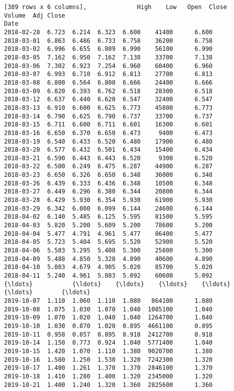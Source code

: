 \documentclass[11pt]{article}
\begin{document}
\begin{Verbatim}[commandchars=\\\{\}]
[389 rows x 6 columns],              High    Low   Open  Close   Volume  Adj Close
Date                                                      
2018-02-28  6.723  6.214  6.323  6.600    41400      6.600
2018-03-01  6.863  6.486  6.733  6.758    36200      6.758
2018-03-02  6.996  6.655  6.809  6.990    56100      6.990
2018-03-05  7.162  6.950  7.162  7.138    33700      7.138
2018-03-06  7.302  6.923  7.254  6.960    60400      6.960
2018-03-07  6.993  6.710  6.912  6.813    27700      6.813
2018-03-08  6.800  6.564  6.800  6.666    24400      6.666
2018-03-09  6.820  6.393  6.762  6.518    28300      6.518
2018-03-12  6.637  6.440  6.620  6.547    32400      6.547
2018-03-13  6.910  6.600  6.625  6.773    45800      6.773
2018-03-14  6.790  6.625  6.790  6.737    33700      6.737
2018-03-15  6.711  6.600  6.711  6.601    16300      6.601
2018-03-16  6.650  6.370  6.650  6.473     9400      6.473
2018-03-19  6.540  6.433  6.520  6.480    17900      6.480
2018-03-20  6.577  6.432  6.501  6.434    15400      6.434
2018-03-21  6.590  6.443  6.443  6.520     9300      6.520
2018-03-22  6.500  6.249  6.475  6.287    44900      6.287
2018-03-23  6.650  6.326  6.650  6.348    36000      6.348
2018-03-26  6.439  6.333  6.436  6.348    10500      6.348
2018-03-27  6.449  6.296  6.380  6.344    20800      6.344
2018-03-28  6.429  5.930  6.354  5.930    61900      5.930
2018-03-29  6.342  6.000  6.099  6.144    24600      6.144
2018-04-02  6.140  5.485  6.125  5.595    81500      5.595
2018-04-03  5.820  5.200  5.609  5.200    78600      5.200
2018-04-04  5.477  4.791  4.961  5.477    86400      5.477
2018-04-05  5.723  5.404  5.695  5.520    52900      5.520
2018-04-06  5.503  5.295  5.400  5.300    25800      5.300
2018-04-09  5.488  4.850  5.328  4.890    40600      4.890
2018-04-10  5.083  4.679  4.905  5.020    85700      5.020
2018-04-11  5.240  4.961  5.083  5.092    60600      5.092
{\ldots}           {\ldots}    {\ldots}    {\ldots}    {\ldots}      {\ldots}        {\ldots}
2019-10-07  1.110  1.060  1.110  1.080   864100      1.080
2019-10-08  1.075  1.030  1.070  1.040  1085100      1.040
2019-10-09  1.070  1.020  1.040  1.040  1264700      1.040
2019-10-10  1.030  0.870  1.020  0.895  4661100      0.895
2019-10-11  0.958  0.857  0.895  0.918  2412700      0.918
2019-10-14  1.150  0.773  0.924  1.040  5771400      1.040
2019-10-15  1.420  1.070  1.110  1.380  9020700      1.380
2019-10-16  1.580  1.250  1.530  1.320  7242300      1.320
2019-10-17  1.400  1.261  1.370  1.370  2846100      1.370
2019-10-18  1.410  1.280  1.400  1.320  2345000      1.320
2019-10-21  1.400  1.240  1.320  1.360  2825600      1.360

\end{Verbatim}
\end{document}
